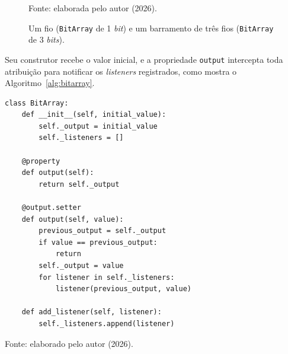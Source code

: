 \begin{figure}[H]
\centering
\caption{Um fio (\texttt{BitArray} de 1 \textit{bit}) e um barramento de três fios (\texttt{BitArray} de 3 \textit{bits}).}
\label{fig:fios}
\begin{center}
\footnotesize Fonte: elaborada pelo autor (2026).
\end{center}
\end{figure}

Seu construtor recebe o valor inicial, e a propriedade \texttt{output} intercepta toda atribuição para notificar os \textit{listeners} registrados, como mostra o Algoritmo~\ref{alg:bitarray}.

\begin{algoritmo}[H]
\caption{Classe BitArray (signals/bit\_array.py).}
\label{alg:bitarray}
\begin{verbatim}
class BitArray:
    def __init__(self, initial_value):
        self._output = initial_value
        self._listeners = []

    @property
    def output(self):
        return self._output

    @output.setter
    def output(self, value):
        previous_output = self._output
        if value == previous_output:
            return
        self._output = value
        for listener in self._listeners:
            listener(previous_output, value)

    def add_listener(self, listener):
        self._listeners.append(listener)
\end{verbatim}
\begin{center}
\footnotesize Fonte: elaborado pelo autor (2026).
\end{center}
\end{algoritmo}

